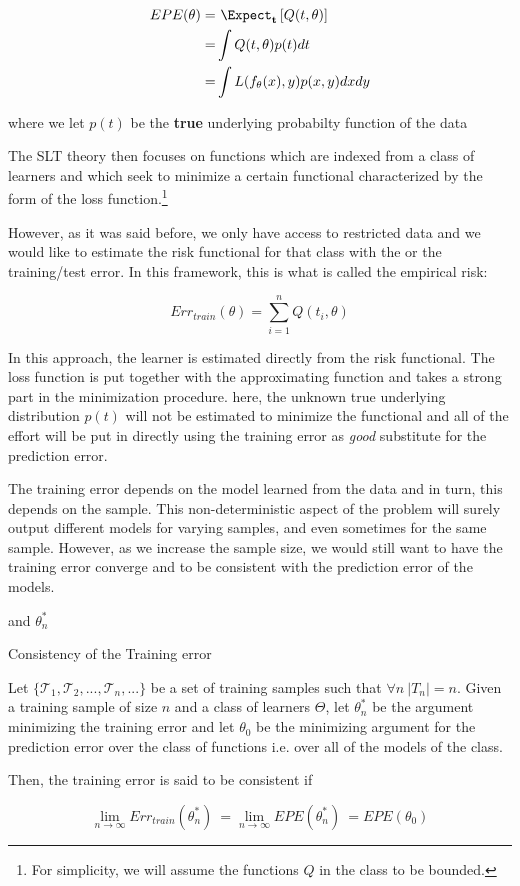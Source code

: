 \begin{equation}\label{vapnik-risk}
\begin{split}
 EPE(\theta) = & \ \Expect_{\textbf{t}} \left[  Q(t,\theta) \right]\\
= & \int Q(t,\theta) p(t) dt  \\
= & \int L(f_\theta(x),y) p(x,y) dx dy 
\end{split}
\end{equation}

where we let $p(t)$ be the \textbf{true} underlying probabilty function of the data

The SLT theory then focuses on functions which are indexed from a class of learners and which seek to minimize a certain functional characterized by the form of the loss function.\footnote{For simplicity, we will assume the functions $Q$ in the class to be bounded.} 

However, as it was said before, we only have access to restricted data and we would like to estimate the risk functional for that class with the or the training/test error. In this framework, this is what is called the empirical risk:

\begin{equation}\label{vapnik-empiricalRisk}
Err_{train}(\theta) =  \sum_{i=1}^n Q(t_i,\theta) 
\end{equation}

In this approach, the learner is estimated directly from the risk functional. The loss function is put together with the approximating function and takes a strong part in the minimization procedure. 
here, the unknown true underlying distribution $p(t)$ will not be estimated to minimize the functional and all of the effort will be put in directly using the training error as \textit{good} substitute for the prediction error.


The training error depends on the model learned from the data and in turn, this depends on the sample.
This non-deterministic aspect of the problem will surely output different models for varying samples, and even sometimes for the same sample. However, as we increase the sample size, we would still want to have the training error converge and to be consistent with the prediction error of the models.



and $\theta^{*}_n$


\begin{definition}{Consistency of the Training error}
	
	Let $\{\mathcal {T}_1, \mathcal {T}_2, ..., \mathcal {T}_n, ...  \}$ be a set of training samples such that $\forall n \ |T_n|=n$. Given a training sample of size $n$ and a class of learners $\Theta$, let $\theta^{*}_n$ be the argument minimizing the training error and let $\theta_0$ be the minimizing argument for the prediction error over the class of functions i.e. over all of the models of the class.
	
	Then, the training error is said to be consistent if 
	
	$$\lim_{n\to\infty} Err_{train}(\theta^{*}_n) \  = \lim_{n\to\infty} EPE(\theta^{*}_n) \ =  EPE(\theta_0)$$

\end{definition}

